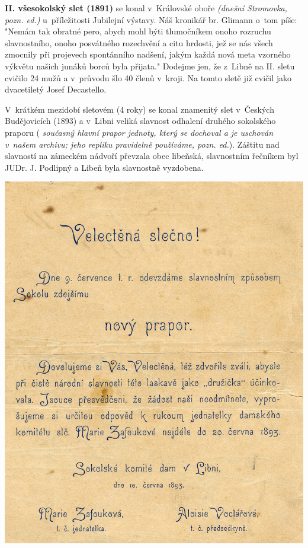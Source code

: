 \documentclass[a5paper, 11pt, twoside]{article}
\newcommand{\pozned}[1]{%
\textit{#1}}
\begin{document}
\textbf{II. všesokolský slet (1891)} se konal v~Královské oboře \pozned{(dnešní Stromovka, pozn. ed.)} u~příležitosti Jubilejní výstavy. Náš kronikář br. Glimann o~tom píše: "Nemám tak obratné pero, abych mohl býti tlumočníkem onoho rozruchu slavnostního, onoho posvátného rozechvění a citu hrdosti, jež se nás všech zmocnily při projevech spontánního nadšení, jakým každá nová meta vzorného výkvětu našich junáků borců byla přijata." Dodejme jen, že z~Libně na II. sletu cvičilo 24 mužů a v~průvodu šlo 40 členů v~kroji. Na tomto sletě již cvičil jako dvacetiletý Josef Decastello.

V~krátkém mezidobí sletovém (4 roky) se konal znamenitý slet v~Českých Budějovicích (1893) a v~Libni veliká slavnost odhalení druhého sokolského praporu (\pozned{současný hlavní prapor jednoty, který se dochoval a je uschován v~našem archivu; jeho repliku pravidelně používáme, pozn. ed.}). Záštitu nad slavností na zámeckém nádvoří převzala obec libeňská, slavnostním řečníkem byl JUDr. J. Podlipný a Libeň byla slavnostně vyzdobena.

\includegraphics[width=\textwidth]{img/10_pozvanka_prapor.jpg}
\end{document}
